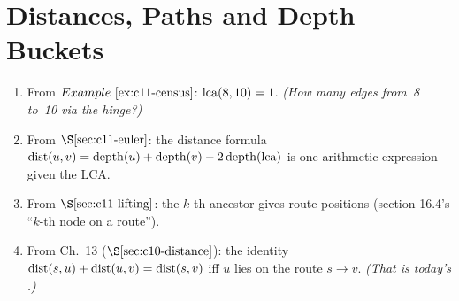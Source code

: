 \section{Distances, Paths and Depth Buckets}\label{sec:c11-paths}

\begin{previouslybox}
\begin{enumerate}[nosep, leftmargin=1.8em]
  \item From \(\exref{c11-census}\): \(\operatorname{lca}(8,10) = 1\).  \emph{(How many
        edges from~8 to~10 via the hinge?)}
  \item From \(\secref{c11-euler}\): the distance formula
        \(\operatorname{dist}(u,v) = \operatorname{depth}(u)+\operatorname{depth}(v)-2\operatorname{depth}(\operatorname{lca})\) is one
        arithmetic expression given the LCA.
  \item From \(\secref{c11-lifting}\): the \(k\)-th ancestor gives route
        positions (section 16.4's ``\(k\)-th node on a route'').
  \item From Ch.~13 (\(\secref{c10-distance}\)): the identity
        \(\operatorname{dist}(s,u)+\operatorname{dist}(u,v)=\operatorname{dist}(s,v)\) iff \(u\) lies on the route
        \(s\to v\).  \emph{(That is today's .)}
\end{enumerate}
\end{previouslybox}


